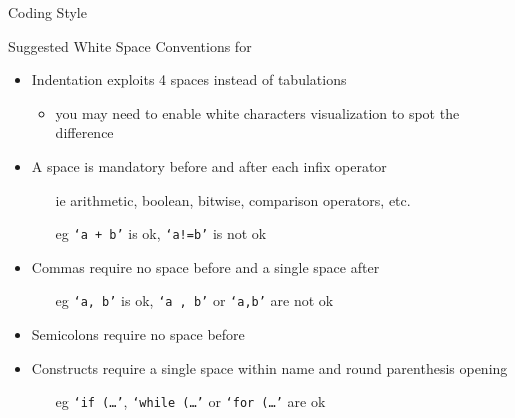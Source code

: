 \documentclass[presentation]{beamer}
\begin{document}
\begin{frame}[allowframebreaks]{\csharp Coding Style}
    \begin{exampleblock}{Suggested White Space Conventions for \csharp}
        \begin{itemize}
            \item Indentation exploits 4 spaces \alert{instead of} tabulations
            \begin{itemize}
                \item you may need to enable white characters visualization to spot the difference
            \end{itemize} 
            \item A space is mandatory \alert{before and after} each \alert{infix} operator
            \begin{itemize}
                \item[ie] arithmetic, boolean, bitwise, comparison operators, etc.
                \item[eg] \texttt{`a + b'} is ok, \texttt{`a!=b'} is not ok
            \end{itemize}
            \item Commas require \alert{no space before} and a \alert{single space after}
            \begin{itemize}
                \item[eg] \texttt{`a, b'} is ok, \texttt{`a , b'} or \texttt{`a,b'} are not ok
            \end{itemize} 
            \item Semicolons require \alert{no space before} 
            \item Constructs require \alert{a single space} within name and round parenthesis opening
            \begin{itemize}
                \item[eg] \texttt{`if (\ldots'}, \texttt{`while (\ldots'} or \texttt{`for (\ldots'} are ok
            \end{itemize} 
        \end{itemize}
    \end{exampleblock}


\end{frame}
\end{document}
